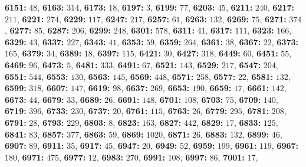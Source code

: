 \textsf{\bfseries 6151:} $48$, \textsf{\bfseries 6163:} $314$, \textsf{\bfseries 6173:} $18$, \textsf{\bfseries 6197:} $3$, \textsf{\bfseries 6199:} $77$, \textsf{\bfseries 6203:} $45$, \textsf{\bfseries 6211:} $240$, \textsf{\bfseries 6217:} $211$, \textsf{\bfseries 6221:} $274$, \textsf{\bfseries 6229:} $117$, \textsf{\bfseries 6247:} $217$, \textsf{\bfseries 6257:} $61$, \textsf{\bfseries 6263:} $132$, \textsf{\bfseries 6269:} $75$, \textsf{\bfseries 6271:} $374$, \textsf{\bfseries 6277:} $85$, \textsf{\bfseries 6287:} $206$, \textsf{\bfseries 6299:} $248$, \textsf{\bfseries 6301:} $578$, \textsf{\bfseries 6311:} $41$, \textsf{\bfseries 6317:} $111$, \textsf{\bfseries 6323:} $166$, \textsf{\bfseries 6329:} $43$, \textsf{\bfseries 6337:} $227$, \textsf{\bfseries 6343:} $41$, \textsf{\bfseries 6353:} $59$, \textsf{\bfseries 6359:} $264$, \textsf{\bfseries 6361:} $38$, \textsf{\bfseries 6367:} $22$, \textsf{\bfseries 6373:} $165$, \textsf{\bfseries 6379:} $34$, \textsf{\bfseries 6389:} $18$, \textsf{\bfseries 6397:} $115$, \textsf{\bfseries 6421:} $30$, \textsf{\bfseries 6427:} $318$, \textsf{\bfseries 6449:} $60$, \textsf{\bfseries 6451:} $55$, \textsf{\bfseries 6469:} $96$, \textsf{\bfseries 6473:} $5$, \textsf{\bfseries 6481:} $333$, \textsf{\bfseries 6491:} $67$, \textsf{\bfseries 6521:} $143$, \textsf{\bfseries 6529:} $217$, \textsf{\bfseries 6547:} $204$, \textsf{\bfseries 6551:} $544$, \textsf{\bfseries 6553:} $130$, \textsf{\bfseries 6563:} $145$, \textsf{\bfseries 6569:} $448$, \textsf{\bfseries 6571:} $258$, \textsf{\bfseries 6577:} $22$, \textsf{\bfseries 6581:} $132$, \textsf{\bfseries 6599:} $318$, \textsf{\bfseries 6607:} $147$, \textsf{\bfseries 6619:} $98$, \textsf{\bfseries 6637:} $269$, \textsf{\bfseries 6653:} $190$, \textsf{\bfseries 6659:} $17$, \textsf{\bfseries 6661:} $142$, \textsf{\bfseries 6673:} $44$, \textsf{\bfseries 6679:} $33$, \textsf{\bfseries 6689:} $26$, \textsf{\bfseries 6691:} $148$, \textsf{\bfseries 6701:} $108$, \textsf{\bfseries 6703:} $75$, \textsf{\bfseries 6709:} $140$, \textsf{\bfseries 6719:} $396$, \textsf{\bfseries 6733:} $230$, \textsf{\bfseries 6737:} $20$, \textsf{\bfseries 6761:} $115$, \textsf{\bfseries 6763:} $26$, \textsf{\bfseries 6779:} $295$, \textsf{\bfseries 6781:} $208$, \textsf{\bfseries 6791:} $28$, \textsf{\bfseries 6793:} $229$, \textsf{\bfseries 6803:} $8$, \textsf{\bfseries 6823:} $163$, \textsf{\bfseries 6827:} $442$, \textsf{\bfseries 6829:} $17$, \textsf{\bfseries 6833:} $125$, \textsf{\bfseries 6841:} $83$, \textsf{\bfseries 6857:} $377$, \textsf{\bfseries 6863:} $59$, \textsf{\bfseries 6869:} $1020$, \textsf{\bfseries 6871:} $26$, \textsf{\bfseries 6883:} $132$, \textsf{\bfseries 6899:} $46$, \textsf{\bfseries 6907:} $89$, \textsf{\bfseries 6911:} $35$, \textsf{\bfseries 6917:} $45$, \textsf{\bfseries 6947:} $20$, \textsf{\bfseries 6949:} $52$, \textsf{\bfseries 6959:} $199$, \textsf{\bfseries 6961:} $119$, \textsf{\bfseries 6967:} $180$, \textsf{\bfseries 6971:} $475$, \textsf{\bfseries 6977:} $12$, \textsf{\bfseries 6983:} $270$, \textsf{\bfseries 6991:} $108$, \textsf{\bfseries 6997:} $86$, \textsf{\bfseries 7001:} $17$, 
